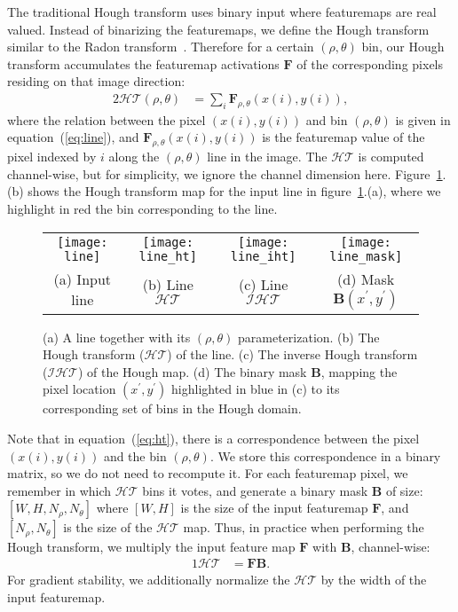 \documentclass[runningheads]{llncs}
\begin{document}
The traditional Hough transform \cite{duda1972use,matas2000robust} uses binary input where featuremaps are real valued. Instead of binarizing the featuremaps, we define the Hough transform similar to the Radon transform~\cite{beatty2012radon}.
Therefore for a certain $(\rho, \theta)$ bin, our Hough transform accumulates the featuremap activations $\mathbf{F}$ of the corresponding pixels residing on that image direction: 
\begin{alignat}{2}
    \mathcal{HT}(\rho,\theta) &= \sum_i \mathbf{F}_{\rho,\theta}(x(i), y(i)),
        \label{eq:ht}
\end{alignat}
where the relation between the pixel $(x(i),y(i))$ and bin $(\rho,\theta)$ is given in equation~(\ref{eq:line}), and $\mathbf{F}_{\rho,\theta}(x(i), y(i))$ is the featuremap value of the pixel indexed by $i$ along the $(\rho, \theta)$ line in the image.
The $\mathcal{HT}$ is computed channel-wise, but for simplicity, we ignore the channel dimension here. 
Figure~\ref{fig:forward}.(b) shows the Hough transform map for the input line in figure~\ref{fig:forward}.(a), where we highlight in red the bin corresponding to the line.
\begin{figure}[t]
    \centering
    \begin{tabular}{cccc}
    \texttt{[image: line]} &
    \texttt{[image: line\_ht]} &
    \texttt{[image: line\_iht]} &
    \texttt{[image: line\_mask]} \\
    (a) Input line & (b) Line $\mathcal{HT}$ & (c) Line $\mathcal{IHT}$ & (d) Mask $\mathbf{B}(x^\prime,y^\prime)$\\
    \end{tabular}
    \caption{(a) A line together with its $(\rho,\theta)$ parameterization. 
    (b) The Hough transform ($\mathcal{HT}$) of the line.
    (c) The inverse Hough transform ($\mathcal{IHT}$) of the Hough map.
    (d) The binary mask $\mathbf{B}$, mapping the pixel location $(x^\prime,y^\prime)$ highlighted in blue in (c) to its corresponding set of bins in the Hough domain.}
    \label{fig:forward}
\end{figure}

Note that in equation~(\ref{eq:ht}), there is a correspondence between the pixel $(x(i),y(i))$ and the bin $(\rho, \theta)$.
We store this correspondence in a binary matrix, so we do not need to recompute it.
For each featuremap pixel, we remember in which $\mathcal{HT}$ bins it votes, and generate a binary mask $\mathbf{B}$ of size: $[W,H,N_\rho,N_\theta]$ where $[W,H]$ is the size of the input featuremap $\mathbf{F}$, and $[N_\rho,N_\theta]$ is the size of the $\mathcal{HT}$ map. 
Thus, in practice when performing the Hough transform, we multiply the input feature map $\mathbf{F}$ with $\mathbf{B}$, channel-wise: 
\begin{alignat}{1}
    \mathcal{HT} &= \mathbf{F} \mathbf{B}.
\end{alignat}
For gradient stability, we additionally normalize the $\mathcal{HT}$ by the width of the input featuremap.
\end{document}
